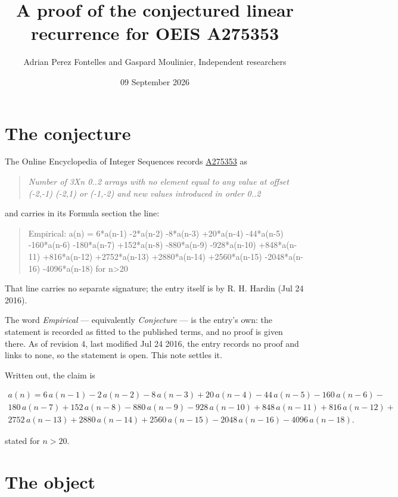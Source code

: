 \documentclass[11pt]{article}
\title{A proof of the conjectured linear recurrence for OEIS A275353}
\author{Adrian Perez Fontelles and Gaspard Moulinier, Independent researchers}
\date{09 September 2026}
\theoremstyle{definition}
\begin{document}
\maketitle
\section{The conjecture}

The Online Encyclopedia of Integer Sequences records \href{https://oeis.org/A275353}{A275353} as

\begin{quote}\itshape Number of 3Xn 0..2 arrays with no element equal to any value at offset (-2,-1) (-2,1) or (-1,-2) and new values introduced in order 0..2\end{quote}

and carries in its Formula section the line:

\begin{quote}\ttfamily Empirical: a(n) = 6*a(n-1) -2*a(n-2) -8*a(n-3) +20*a(n-4) -44*a(n-5) -160*a(n-6) -180*a(n-7) +152*a(n-8) -880*a(n-9) -928*a(n-10) +848*a(n-11) +816*a(n-12) +2752*a(n-13) +2880*a(n-14) +2560*a(n-15) -2048*a(n-16) -4096*a(n-18) for n>20\end{quote}

That line carries no separate signature; the entry itself is by R. H. Hardin (Jul 24 2016).

The word {\itshape Empirical} --- equivalently {\itshape Conjecture} --- is the entry's own: the statement is recorded as fitted to the published terms, and no proof is given there. As of revision 4, last modified Jul 24 2016, the entry records no proof and links to none, so the statement is open. This note settles it.

Written out, the claim is

\begin{multline*} a(n) = 6\,a(n-1) - 2\,a(n-2) - 8\,a(n-3) + 20\,a(n-4) - 44\,a(n-5) - 160\,a(n-6) - \\ 180\,a(n-7) + 152\,a(n-8) - 880\,a(n-9) - 928\,a(n-10) + 848\,a(n-11) + 816\,a(n-12) + \\ 2752\,a(n-13) + 2880\,a(n-14) + 2560\,a(n-15) - 2048\,a(n-16) - 4096\,a(n-18). \end{multline*}

stated for $n > 20$.

\section{The object}
\end{document}
